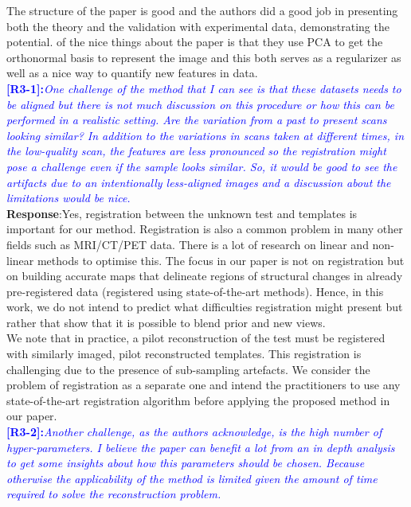 \documentclass{article}
\begin{document}
The structure of the paper is good and the authors did a good job in presenting both the theory and the validation with experimental data, demonstrating the potential. of the nice things about the paper is that they use PCA to get the orthonormal basis to represent the image and this both serves as a regularizer as well as a nice way to quantify new features in data.
\\

\textcolor{blue}{\textbf{[R3-1]:}\textit{One challenge of the method that I can see is that these datasets needs to be aligned but there is not much discussion on this procedure or how this can be performed in a realistic setting. Are the variation from a past to present scans looking similar? In addition to the variations in scans taken at different times, in the low-quality scan, the features are less pronounced so the registration might pose a challenge even if the sample looks similar. So, it would be good to see the artifacts due to an intentionally less-aligned images and a discussion about the limitations would be nice.
}}\\

\textbf{Response}:Yes, registration between the unknown test and templates is important for our method. Registration is also a common problem in many other fields such as MRI/CT/PET data.  There is a lot of research on linear and non-linear methods to optimise this. The focus in our paper is not on registration but on building accurate maps that delineate regions of structural changes in already pre-registered data (registered using state-of-the-art methods).  Hence, in this work, we do not intend to predict what difficulties registration might present but rather that show that it is possible to blend prior and new views.\\

We note that in practice, a pilot reconstruction of the test must be registered with similarly imaged, pilot reconstructed templates. This registration is challenging due to the presence of sub-sampling artefacts. We consider the problem of registration as a separate one and intend the practitioners to use any state-of-the-art registration algorithm before applying the proposed method in our paper. 
\\

\textcolor{blue}{\textbf{[R3-2]:}\textit{Another challenge, as the authors acknowledge, is the high number of hyper-parameters. I believe the paper can benefit a lot from an in depth analysis to get some insights about how this parameters should be chosen. Because otherwise the applicability of the method is limited given the amount of time required to solve the reconstruction problem.
}}\\
\end{document}
